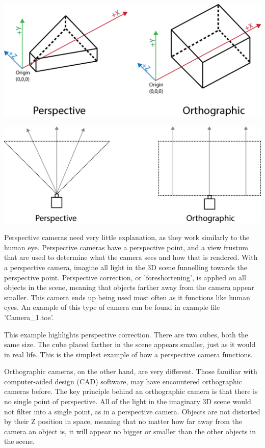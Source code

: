 \begin{fullwidth}
\begin{center}
\includegraphics{./img/6.2/rendering-1.png}

\includegraphics{./img/6.2/rendering-2.png}
\end{center}

Perspective cameras need very little explanation, as they work similarly to the human eye. Perspective cameras have a perspective point, and a view frustum that are used to determine what the camera sees and how that is rendered. With a perspective camera, imagine all light in the 3D scene funnelling towards the perspective point. Perspective correction, or 'foreshortening', is applied on all objects in the scene, meaning that objects farther away from the camera appear smaller. This camera ends up being used most often as it functions like human eyes. An example of this type of camera can be found in example file 'Camera\_1.toe'.

This example highlights perspective correction. There are two cubes, both the same size. The cube placed farther in the scene appears smaller, just as it would in real life. This is the simplest example of how a perspective camera functions.

Orthographic cameras, on the other hand, are very different. Those familiar with computer-aided design (CAD) software, may have encountered orthographic cameras before. The key principle behind an orthographic camera is that there is no single point of perspective. All of the light in the imaginary 3D scene would not filter into a single point, as in a perspective camera. Objects are not distorted by their Z position in space, meaning that no matter how far away from the camera an object is, it will appear no bigger or smaller than the other objects in the scene. 


\end{fullwidth}
